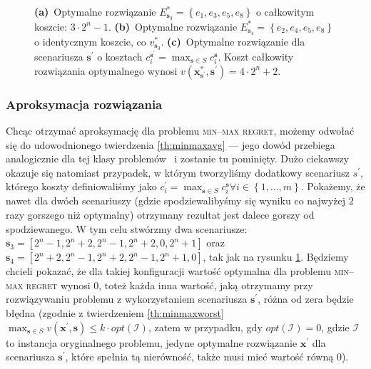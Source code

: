 \begin{figure}[!htbp]
{		\textbf{(a)}~Optymalne rozwiązanie $E^{\ast}_{\textbf{s}_{3}} = \left\{ e_{1}, e_{3}, e_{5}, e_{8} \right\}$ o całkowitym koszcie: $3 \cdot 2^{n} - 1$.
		\textbf{(b)}~Optymalne rozwiązanie $E^{\ast}_{\textbf{s}_{4}} = \left\{ e_{2}, e_{4}, e_{5}, e_{8} \right\}$ o identycznym koszcie, co $v^{\ast}_{\textbf{s}_{3}}$.
		\textbf{(c)}~Optymalne rozwiązanie dla scenariusza $\textbf{s}^{\prime}$ o kosztach $c_{i}^{\textbf{s}^{\prime}} = \max_{\textbf{s} \in S} c_{i}^{\textbf{s}}$. Koszt całkowity rozwiązania optymalnego wynosi $v \left( \textbf{x}^{\ast}_{\textbf{s}^{\prime}}, \textbf{s}^{\prime} \right) = 4 \cdot 2^{n} + 2$.
	}
	\label{fig:minmaxregexample2}
\end{figure}

\subsubsection{Aproksymacja rozwiązania}

Chcąc otrzymać aproksymację dla problemu \textsc{min--max regret}, możemy odwołać się do udowodnionego twierdzenia \ref{th:minmaxavg} --- jego dowód przebiega analogicznie dla tej klasy problemów~\cite[$430$]{minmaxSurvey} i zostanie tu pominięty. Dużo ciekawszy okazuje się natomiast przypadek, w którym tworzyliśmy dodatkowy scenariusz $s^{\prime}$, którego koszty definiowaliśmy jako $c^{\prime}_{i} = \max_{\textbf{s} \in S} c^{\textbf{s}}_{i} \forall i \in \left\{ 1, \dots, m \right\}$. Pokażemy, że nawet dla dwóch scenariuszy (gdzie spodziewalibyśmy się wyniku co najwyżej $2$ razy gorszego niż optymalny) otrzymany rezultat jest dalece gorszy od spodziewanego. W tym celu stwórzmy dwa scenariusze: $\textbf{s}_{3} = \left[ 2^{n} - 1, 2^{n} + 2, 2^{n} - 1, 2^{n} + 2, 0, 2^{n} + 1 \right]$ oraz $\textbf{s}_{4} = \left[ 2^{n} + 2, 2^{n} - 1, 2^{n} + 2, 2^{n} - 1, 2^{n} + 1, 0 \right]$, tak jak na rysunku \ref{fig:minmaxregexample2}. Będziemy chcieli pokazać, że dla takiej konfiguracji wartość optymalna dla problemu \textsc{min--max regret} wynosi $0$, toteż każda inna wartość, jaką otrzymamy przy rozwiązywaniu problemu z wykorzystaniem scenariusza $\textbf{s}^{\prime}$, różna od zera będzie błędna (zgodnie z twierdzeniem \ref{th:minmaxworst} $\max_{\textbf{s} \in S} v \left( \textbf{x}^{\prime}, \textbf{s} \right) \leqslant k \cdot opt \left( \mathcal{I} \right)$, zatem w przypadku, gdy $opt \left( \mathcal{I} \right) = 0$, gdzie $\mathcal{I}$ to instancja oryginalnego problemu, jedyne optymalne rozwiązanie $\textbf{x}^{\prime}$ dla scenariusza $\textbf{s}^{\prime}$, które spełnia tą nierówność, także musi mieć wartość równą $0$). 

